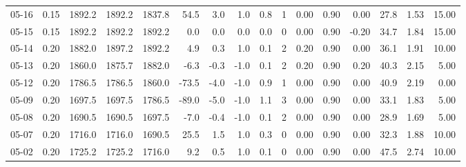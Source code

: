 \begin{threeparttable}
{\begin{tabular}{lrrrrrrrrrrrrrrr}
  05-16 &     0.15 & 1892.2 & 1892.2 & 1837.8 &       54.5 &            3.0 &                      1.0 &                 0.8 &              1 &       0.00 &      0.90 &           0.00 &             27.8 &            1.53 &                  15.00 \\
  05-15 &     0.15 & 1892.2 & 1892.2 & 1892.2 &        0.0 &            0.0 &                      0.0 &                 0.0 &              0 &       0.00 &      0.90 &          -0.20 &             34.7 &            1.84 &                  15.00 \\
  05-14 &     0.20 & 1882.0 & 1897.2 & 1892.2 &        4.9 &            0.3 &                      1.0 &                 0.1 &              2 &       0.20 &      0.90 &           0.00 &             36.1 &            1.91 &                  10.00 \\
  05-13 &     0.20 & 1860.0 & 1875.7 & 1882.0 &       -6.3 &           -0.3 &                     -1.0 &                 0.1 &              2 &       0.20 &      0.90 &           0.20 &             40.3 &            2.15 &                   5.00 \\
  05-12 &     0.20 & 1786.5 & 1786.5 & 1860.0 &      -73.5 &           -4.0 &                     -1.0 &                 0.9 &              1 &       0.00 &      0.90 &           0.00 &             40.9 &            2.19 &                   0.00 \\
  05-09 &     0.20 & 1697.5 & 1697.5 & 1786.5 &      -89.0 &           -5.0 &                     -1.0 &                 1.1 &              3 &       0.00 &      0.90 &           0.00 &             33.1 &            1.83 &                   5.00 \\
  05-08 &     0.20 & 1690.5 & 1690.5 & 1697.5 &       -7.0 &           -0.4 &                     -1.0 &                 0.1 &              2 &       0.00 &      0.90 &           0.00 &             28.9 &            1.69 &                   5.00 \\
  05-07 &     0.20 & 1716.0 & 1716.0 & 1690.5 &       25.5 &            1.5 &                      1.0 &                 0.3 &              0 &       0.00 &      0.90 &           0.00 &             32.3 &            1.88 &                  10.00 \\
  05-02 &     0.20 & 1725.2 & 1725.2 & 1716.0 &        9.2 &            0.5 &                      1.0 &                 0.1 &              0 &       0.00 &      0.90 &           0.00 &             47.5 &            2.74 &                  10.00 \\

\end{tabular}}
\end{threeparttable}
